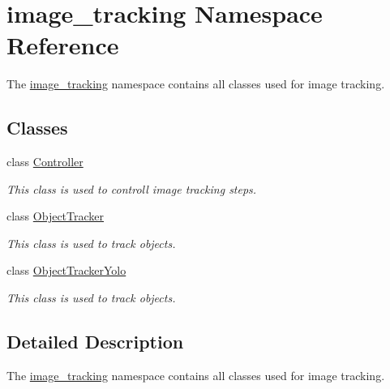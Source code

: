 \hypertarget{namespaceimage__tracking}{}\section{image\+\_\+tracking Namespace Reference}
\label{namespaceimage__tracking}


The \mbox{\hyperlink{namespaceimage__tracking}{image\+\_\+tracking}} namespace contains all classes used for image tracking.  


\subsection*{Classes}
\begin{DoxyCompactItemize}
\item 
class \mbox{\hyperlink{classimage__tracking_1_1_controller}{Controller}}
\begin{DoxyCompactList}\small\item\em This class is used to controll image tracking steps. \end{DoxyCompactList}\item 
class \mbox{\hyperlink{classimage__tracking_1_1_object_tracker}{Object\+Tracker}}
\begin{DoxyCompactList}\small\item\em This class is used to track objects. \end{DoxyCompactList}\item 
class \mbox{\hyperlink{classimage__tracking_1_1_object_tracker_yolo}{Object\+Tracker\+Yolo}}
\begin{DoxyCompactList}\small\item\em This class is used to track objects. \end{DoxyCompactList}\end{DoxyCompactItemize}


\subsection{Detailed Description}
The \mbox{\hyperlink{namespaceimage__tracking}{image\+\_\+tracking}} namespace contains all classes used for image tracking. 